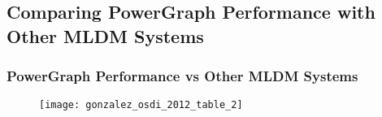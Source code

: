 \subsection{Comparing PowerGraph Performance with Other MLDM Systems}

\begin{frame}
  \frametitle{PowerGraph Performance vs Other MLDM Systems}
  \begin{figure}
    \texttt{[image: gonzalez\_osdi\_2012\_table\_2]}
    \caption{\cite[OSDI '12]{gonzalez2012powergraph}}
  \end{figure}
\end{frame}

